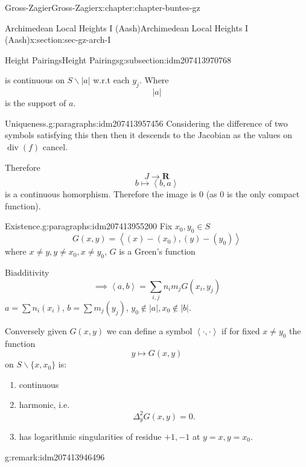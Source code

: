 \documentclass[oneside,10pt,]{book}
\numberwithin{equation}{section}
\newcommand{\pair}[2]{\left\langle #1, #2 \right\rangle}
\newcommand{\RR}{\mathbf{R}}
\DeclareMathOperator{\divisor}{div}
\begin{document}
\begin{chapterptx}{Gross-Zagier}{}{Gross-Zagier}{}{}{x:chapter:chapter-buntes-gz}
\begin{sectionptx}{Archimedean Local Heights I (Aash)}{}{Archimedean Local Heights I (Aash)}{}{}{x:section:sec-gz-arch-I}
\begin{subsectionptx}{Height Pairings}{}{Height Pairings}{}{}{g:subsection:idm207413970768}
\begin{enumerate}
\begin{equation*}
\end{equation*}
is continuous on \(S\smallsetminus |a|\) w.r.t each \(y_j\). Where%
\begin{equation*}
|a|
\end{equation*}
is the support of \(a\).%
\end{enumerate}
%
\begin{paragraphs}{Uniqueness.}{g:paragraphs:idm207413957456}%
Considering the difference of two symbols satisfying this then then it descends to the Jacobian as the values on \(\divisor(f)\) cancel.%
\par
Therefore%
\begin{equation*}
J\to \RR
\end{equation*}
%
\begin{equation*}
b\mapsto \pair b a
\end{equation*}
is a continuous homorphism. Therefore the image is 0 (as 0 is the only compact function).%
\end{paragraphs}%
\begin{paragraphs}{Existence.}{g:paragraphs:idm207413955200}%
Fix \(x_0, y_0 \in S\)%
\begin{equation*}
G(x,y)  = \pair{(x)  - (x_0)}{ (y) - (y_0)}
\end{equation*}
where \(x\ne y,y\ne x_0,x\ne y_0\), \(G\) is a Green's function%
\par
Biadditivity%
\begin{equation*}
\implies \pair ab = \sum_{i,j} n_i m_j G(x_i, y_j)
\end{equation*}
\(a = \sum n_i(x_i)\), \(b = \sum m_j(y_j)\), \(y_0 \not \in |a|,x_0 \not \in |b|\).%
\par
Conversely given \(G(x,y)\) we can define a symbol \(\pair \cdot \cdot\) if for fixed \(x \ne y_0\) the function%
\begin{equation*}
y \mapsto G(x,y)
\end{equation*}
on \(S\smallsetminus\{x,x_0\}\) is:%
\begin{enumerate}
\item{}continuous%
\item{}harmonic, i.e.%
\begin{equation*}
\Delta _y^2 G(x,y) = 0\text{.}
\end{equation*}
%
\item{}has logarithmic singularities of residue \(+1,-1\) at \(y=x,y=x_0\).%
\end{enumerate}
%
\begin{remark}{}{g:remark:idm207413946496}%

\end{remark}
\end{paragraphs}
\end{subsectionptx}
\end{sectionptx}
\end{chapterptx}
\end{document}
